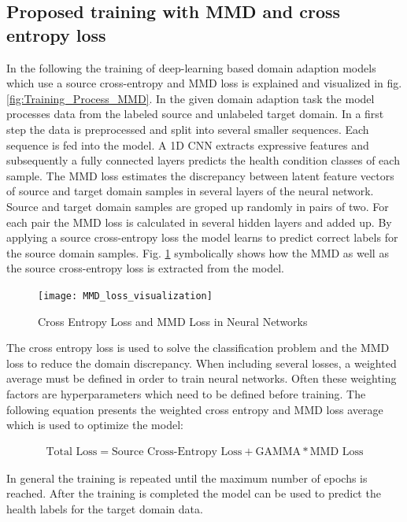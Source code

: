 \subsection{Proposed training with MMD and cross entropy loss} \label{sec:Proposed_training}

In the following the training of deep-learning based domain adaption models which use a source cross-entropy and MMD loss is explained and visualized in fig. \ref{fig:Training_Process_MMD}. In the given domain adaption task the model processes data from the labeled source and unlabeled target domain. In a first step the data is preprocessed and split into several smaller sequences. Each sequence is fed into the model. A 1D CNN extracts expressive features and subsequently a fully connected layers predicts the health condition classes of each sample. The MMD loss estimates the discrepancy between latent feature vectors of source and target domain samples in several layers of the neural network. Source and target domain samples are groped up randomly in pairs of two. For each pair the MMD loss is calculated in several hidden layers and added up. By applying a source cross-entropy loss the model learns to predict correct labels for the source domain samples. Fig. \ref{fig:MMD_Loss_and_CE_loss} symbolically shows how the MMD as well as the source cross-entropy loss is extracted from the model.

\begin{figure}[htpb]
  \centering
  \texttt{[image: MMD\_loss\_visualization]}
  \caption {Cross Entropy Loss and MMD Loss in Neural Networks} \label{fig:MMD_Loss_and_CE_loss}
\end{figure}
The cross entropy loss is used to solve the classification problem and the MMD loss to reduce the domain discrepancy. When including several losses, a weighted average must be defined in order to train neural networks. Often these weighting factors are hyperparameters which need to be defined before training. The following equation presents the weighted cross entropy and MMD loss average which is used to optimize the model:

\begin{align}
    \mbox{Total Loss} = \mbox{Source Cross-Entropy Loss} + \mbox{GAMMA} * \mbox{MMD Loss}
\end{align}

In general the training is repeated until the maximum number of epochs is reached. After the training is completed the model can be used to predict the health labels for the target domain data. 

